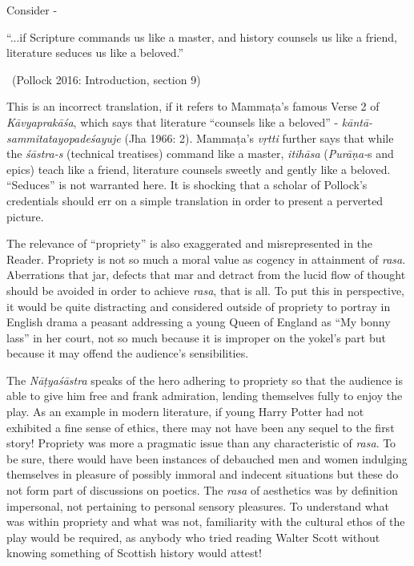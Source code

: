 Consider -

\begin{myquote}
“...if Scripture commands us like a master, and history counsels us like a friend, literature seduces us like a beloved.” 

~\hfill (Pollock 2016: Introduction, section 9)
\end{myquote}

This is an incorrect translation, if it refers to Mammaṭa’s famous Verse 2 of \textit{Kāvyaprakāśa}, which says that literature “counsels like a beloved” -\textit{ kāntā-sammitatayopadeśayuje }(Jha 1966: 2). Mammaṭa’s \textit{vṛtti} further says that while the \textit{śāstra-s }(technical treatises) command like a master, \textit{itihāsa} (\textit{Purāṇa-}s and epics) teach like a friend, literature counsels sweetly and gently like a beloved. “Seduces” is not warranted here. It is shocking that a scholar of Pollock’s credentials should err on a simple translation in order to present a perverted picture.

The relevance of “propriety” is also exaggerated and misrepresented in the Reader. Propriety is not so much a moral value as cogency in attainment of \textit{rasa}. Aberrations that jar, defects that mar and detract from the lucid flow of thought should be avoided in order to achieve \textit{rasa}, that is all. To put this in perspective, it would be quite distracting and considered outside of propriety to portray in English drama a peasant addressing a young Queen of England as “My bonny lass” in her court, not so much because it is improper on the yokel’s part but because it may offend the audience’s sensibilities.

The \textit{Nāṭyaśāstra} speaks of the hero adhering to propriety so that the audience is able to give him free and frank admiration, lending themselves fully to enjoy the play. As an example in modern literature, if young Harry Potter had not exhibited a fine sense of ethics, there may not have been any sequel to the first story! Propriety was more a pragmatic issue than any characteristic of \textit{rasa}. To be sure, there would have been instances of debauched men and women indulging themselves in pleasure of possibly immoral and indecent situations but these do not form part of discussions on poetics. The \textit{rasa} of aesthetics was by definition impersonal, not pertaining to personal sensory pleasures. To understand what was within propriety and what was not, familiarity with the cultural ethos of the play would be required, as anybody who tried reading Walter Scott without knowing something of Scottish history would attest!

